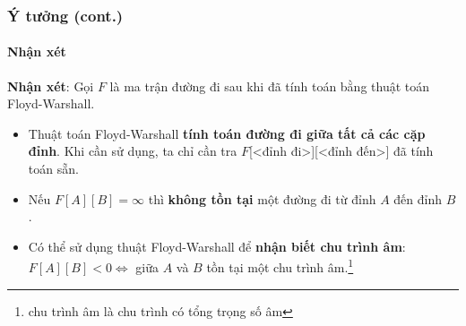 \documentclass[12pt]{beamer}
\begin{document}
    \begin{frame}
        \frametitle{Ý tưởng (cont.)}
        \framesubtitle{Nhận xét}
        \textbf{Nhận xét}: Gọi $ F $ là ma trận đường đi sau khi đã tính toán bằng thuật toán Floyd-Warshall.\pause
        \begin{itemize}
            \item Thuật toán Floyd-Warshall \textbf{tính toán đường đi giữa tất cả các cặp đỉnh}. Khi cần sử dụng, ta chỉ cần tra $ F $[<đỉnh đi>][<đỉnh đến>] đã tính toán sẵn.\pause
            \item Nếu $F[A][B] = \infty $ thì \textbf{không tồn tại} một đường đi từ đỉnh $A$ đến đỉnh $B$.\pause
            \item Có thể sử dụng thuật Floyd-Warshall để \textbf{nhận biết chu trình âm}: $F[A][B] < 0 \iff $ giữa $ A $ và $ B $ tồn tại một chu trình âm.\footnote{chu trình âm là chu trình có tổng trọng số âm}\cite{gtlt:book}
        \end{itemize}
    \end{frame}
\end{document}
